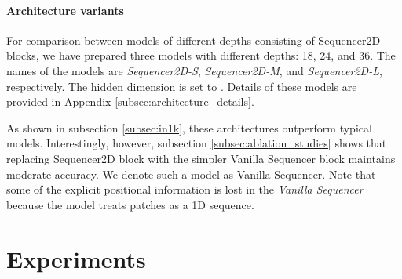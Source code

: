 \documentclass{article}
\begin{document}
\paragraph{Architecture variants}

For comparison between models of different depths consisting of Sequencer2D blocks, we have prepared  three models with different depths: 18, 24, and 36. The names of the models are \textit{Sequencer2D-S}, \textit{Sequencer2D-M}, and \textit{Sequencer2D-L}, respectively. The hidden dimension is set to . Details of these models are provided in Appendix \ref{subsec:architecture_details}.

As shown in subsection \ref{subsec:in1k}, these architectures outperform typical models. Interestingly, however, subsection \ref{subsec:ablation_studies} shows that replacing Sequencer2D block with the simpler Vanilla Sequencer block maintains moderate accuracy. We denote such a model as Vanilla Sequencer. Note that some of the explicit positional information is lost in the \textit{Vanilla Sequencer} because the model treats patches as a 1D sequence.

\section{Experiments}
\label{sec:expriments}
\end{document}
